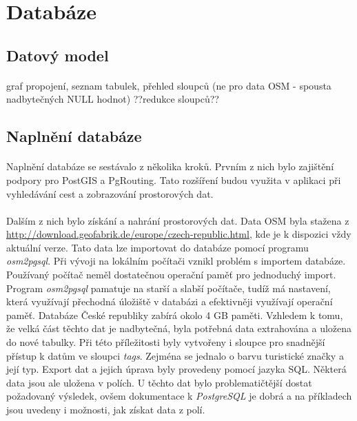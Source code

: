 \documentclass[11pt,a4paper,titlepage,oneside]{book}
\begin{document}
		\section{Databáze}
			\subsection{Datový model}
				\paragraph{} graf propojení, seznam tabulek, přehled sloupců (ne pro data OSM - spousta nadbytečných NULL hodnot) ??redukce sloupců??
			\subsection{Naplnění databáze}
				\paragraph{} Naplnění databáze se sestávalo z několika kroků. Prvním z nich bylo zajištění podpory pro PostGIS a PgRouting. Tato rozšíření budou využita v aplikaci při vyhledávání cest a zobrazování prostorových dat.
				\paragraph{}Dalším z nich bylo získání a nahrání prostorových dat. Data OSM byla stažena z  \url{http://download.geofabrik.de/europe/czech-republic.html}, kde je k dispozici vždy aktuální verze. Tato data lze importovat do databáze pomocí programu \textit{osm2pgsql}. Při vývoji na lokálním počítači vznikl problém s importem databáze. Používaný počítač neměl dostatečnou operační paměť pro jednoduchý import. Program \textit{osm2pgsql} pamatuje na starší a slabší počítače, tudíž má nastavení, která využívají přechodná úložiště v databázi a efektivněji využívají operační paměť. Databáze České republiky zabírá okolo 4 GB paměti. Vzhledem k tomu, že velká část těchto dat je nadbytečná, byla potřebná data extrahována a uložena do nové tabulky. Při této příležitosti byly vytvořeny i sloupce pro snadnější přístup k datům ve sloupci \textit{tags}. Zejména se jednalo o barvu turistické značky a její typ. Export dat a jejich úprava byly provedeny pomocí jazyka SQL. Některá data jsou ale uložena v polích. U těchto dat bylo problematičtější dostat požadovaný výsledek, ovšem dokumentace k \textit{PostgreSQL}\cite{PostgreSQL} je dobrá a na příkladech jsou uvedeny i možnosti, jak získat data z polí.
\end{document}
